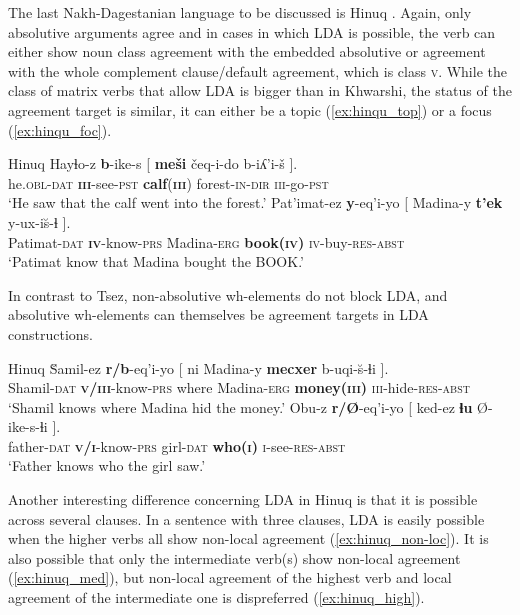 \documentclass[output=paper
,modfonts
,nonflat]{langsci/langscibook}
\begin{document}
The last Nakh-Dagestanian language to be discussed is Hinuq \citep{Forker2012}. Again, only absolutive arguments agree and in cases in which LDA is possible, the verb can either show noun class agreement with the embedded absolutive or agreement with the whole complement clause/default agreement, which is class \textsc{v}. While the class of matrix verbs that allow LDA is bigger than in Khwarshi, the status of the agreement target is similar, it can either be a topic (\ref{ex:hinqu_top}) or a focus (\ref{ex:hinqu_foc}).
\begin{exe}
\ex Hinuq \citep[][628]{Forker2012}
	\xlist
	\ex \label{ex:hinqu_top}
		\gll Hayɬo-z \textbf{b}-ike-s [ \textbf{me\v{s}i} \v{c}eq-i-do b-iʎ'i-\v{s} ].\\
			 he.\textsc{obl}-\textsc{dat} \textbf{\textsc{iii}}-see-\textsc{pst} {} \textbf{calf}(\textbf{\textsc{iii}}) forest-\textsc{in}-\textsc{dir} \textsc{iii}-go-\textsc{pst}\\
		\glt `He saw that the calf went into the forest.' 
	\ex  \label{ex:hinqu_foc}
		\gll Pat'imat-ez \textbf{y}-eq'i-yo [ Madina-y \textbf{t'ek} y-ux-i\u{s}-ɬ ].\\
			 Patimat-\textsc{dat} \textbf{\textsc{iv}}-know-\textsc{prs} {} Madina-\textsc{erg} \textbf{book(\textsc{iv})} \textsc{iv}-buy-\textsc{res-abst}\\
		\glt `Patimat know that Madina bought the BOOK.'
	\endxlist
\end{exe}
In contrast to Tsez, non-absolutive wh-elements do not block LDA, and absolutive wh-elements can themselves be agreement targets in LDA constructions.
\begin{exe}
\ex Hinuq \citep[][637]{Forker2012}
	\xlist
	\ex
		\gll \u{S}amil-ez \textbf{r/b}-eq'i-yo [ ni Madina-y \textbf{mecxer} b-uqi-\u{s}-ɬi ].\\
			 Shamil-\textsc{dat} \textbf{\textsc{v/iii}}-know-\textsc{prs} {} where Madina-\textsc{erg} \textbf{money(\textsc{iii})} \textsc{iii}-hide-\textsc{res-abst}\\
		\glt `Shamil knows where Madina hid the money.'
	\ex 
		\gll Obu-z \textbf{r/\O{}}-eq'i-yo [ ked-ez \textbf{ɬu} \O{}-ike-s-ɬi ].\\
			 father-\textsc{dat} \textbf{\textsc{v/i}}-know-\textsc{prs} {} girl-\textsc{dat} \textbf{who(\textsc{i})} \textsc{i}-see-\textsc{res-abst}\\
		\glt `Father knows who the girl saw.'
	\endxlist
\end{exe}
Another interesting difference concerning LDA in Hinuq is that it is possible across several clauses. In a sentence with three clauses, LDA is easily possible when the higher verbs all show non-local agreement (\ref{ex:hinuq_non-loc}). It is also possible that only the intermediate verb(s) show non-local agreement (\ref{ex:hinuq_med}), but non-local agreement of the highest verb and local agreement of the intermediate one is dispreferred (\ref{ex:hinuq_high}).
\end{document}

